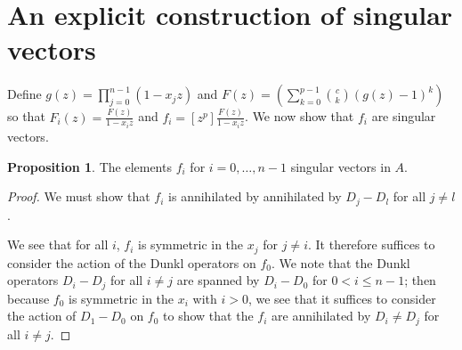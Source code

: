 \documentclass{amsart}
\numberwithin{equation}{section}
\theoremstyle{definition}
\newtheorem{proposition}[theorem]{Proposition}
\begin{document}

\section{An explicit construction of singular vectors}

Define $g(z)=\prod_{j=0}^{n-1} (1-x_jz)$ and $F(z) =\left(\sum_{k=0}^{p-1} \binom{c}{k} (g(z)-1)^k\right)$ so that $F_i(z) = \frac{F(z)}{1-x_iz}$ and $f_i = [z^p] \frac{F(z)}{1-x_iz}$.  We now show that $f_i$ are singular vectors.
\begin{proposition}\label{prop:ann} 
The elements $f_i$ for $i=0,\dots,n-1$ singular vectors in $A$.
\end{proposition}
\begin{proof}
We must show that $f_i$ is annihilated by annihilated by $D_j-D_l$ for all $j \ne l$.

We see that for all $i$, $f_i$ is symmetric in the $x_j$ for $j \ne i$. It therefore suffices to consider the action of the Dunkl operators on $f_0$. We note that the Dunkl operators $D_i-D_j$ for all $i \ne j$ are spanned by $D_i-D_0$ for $0<i \le n-1$; then because $f_0$ is symmetric in the $x_i$ with $i > 0$, we see that it suffices to consider the action of $D_1-D_0$ on $f_0$ to show that the $f_i$ are annihilated by $D_i \ne D_j$ for all $i \ne j$. 


\end{proof}
\end{document}
